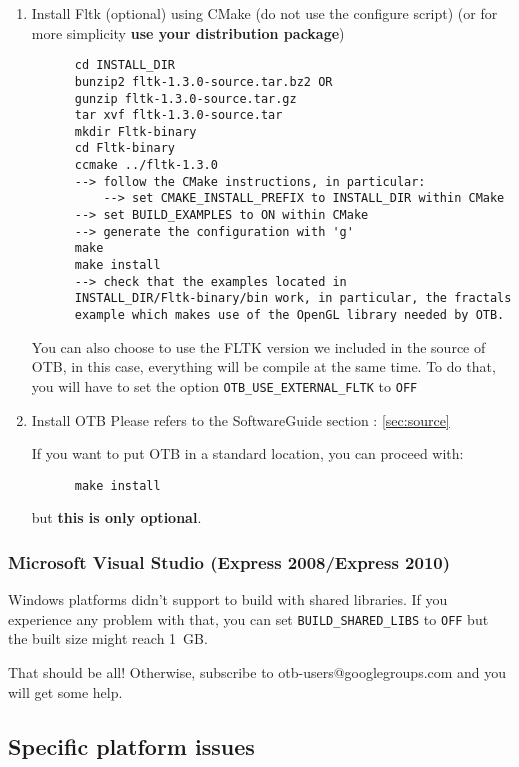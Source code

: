 \begin{enumerate}
\item Install Fltk (optional) using CMake (do not use the configure script) (or for more simplicity \textbf{use your distribution package})
  \begin{verbatim}
      cd INSTALL_DIR
      bunzip2 fltk-1.3.0-source.tar.bz2 OR
      gunzip fltk-1.3.0-source.tar.gz
      tar xvf fltk-1.3.0-source.tar
      mkdir Fltk-binary
      cd Fltk-binary
      ccmake ../fltk-1.3.0
      --> follow the CMake instructions, in particular:
          --> set CMAKE_INSTALL_PREFIX to INSTALL_DIR within CMake
	  --> set BUILD_EXAMPLES to ON within CMake
	  --> generate the configuration with 'g'
      make
      make install
      --> check that the examples located in
      INSTALL_DIR/Fltk-binary/bin work, in particular, the fractals
      example which makes use of the OpenGL library needed by OTB.
  \end{verbatim}

   You can also choose to use the FLTK version we included in the source of OTB, in this case, everything will be compile at the same time. To do that, you will have to set the option \texttt{OTB\_USE\_EXTERNAL\_FLTK} to \texttt{OFF}

\item Install OTB
  Please refers to the SoftwareGuide section : \ref{sec:source}

  If you want to put OTB in a standard location, you can proceed with:

  \begin{verbatim}
      make install
  \end{verbatim}

  but \textbf{this is only optional}.


\end{enumerate}

\subsubsection{Microsoft Visual Studio (Express 2008/Express 2010)}
Windows platforms didn't support to build with shared libraries. If you experience any problem
with that, you can set \texttt{BUILD\_SHARED\_LIBS} to \texttt{OFF} but the
built size might reach 1~GB.

That should be all! Otherwise, subscribe to
   otb-users@googlegroups.com and you will get some help.

\subsection{Specific platform issues}
